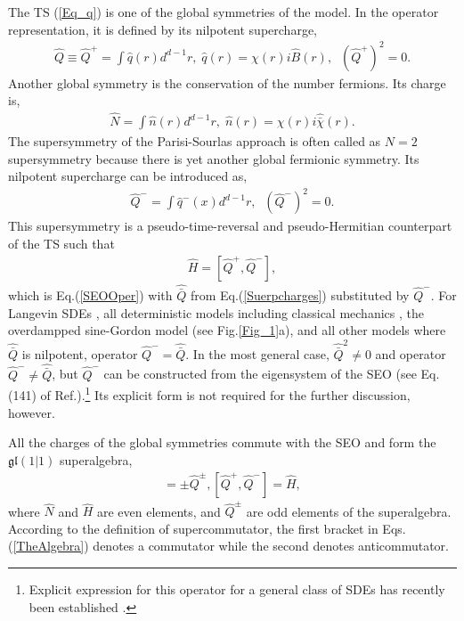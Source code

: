 \documentclass[final,5p,10pt,times,twocolumn,year]{elsarticle}
\begin{document}
The TS (\ref{Eq_q}) is one of the global symmetries of the model. In the operator representation, it is defined by its nilpotent supercharge, 
\begin{eqnarray}
\hat Q \equiv \hat Q^+ =  \int \hat q(r) d^{d-1}r,\; \hat q(r) = \chi(r) i\hat B(r), \;\; (\hat{Q}^+)^2 =0.
\end{eqnarray}
Another global symmetry is the conservation of the number fermions. Its charge is,
\begin{eqnarray}
    \hat N = \int \hat n(r) d^{d-1} r,\; \hat n(r) = \chi(r) i\hat{\bar \chi}(r).
\end{eqnarray}
The supersymmetry of the Parisi-Sourlas approach is often called as $N=2$ supersymmetry because there is yet another global fermionic symmetry. Its nilpotent supercharge can be introduced as,
\begin{eqnarray}
\hat{Q}^- = \int  \hat{q}^-(x) d^{d-1}r, \; \; (\hat{Q}^-)^2 = 0.
\end{eqnarray}
This supersymmetry is a pseudo-time-reversal and pseudo-Hermitian counterpart of the TS such that
\begin{eqnarray}
   \hat H = [\hat Q^+, \hat Q^-],
\end{eqnarray}
which is Eq.(\ref{SEOOper}) with $\hat{\bar Q}$ from Eq.(\ref{Suerpcharges}) substituted by $\hat Q^-$. For Langevin SDEs \cite{TFT_BOOK}, all deterministic models including classical mechanics \cite{Gozzi_New}, the overdampped sine-Gordon model \cite{OVCHINNIKOV2024114611} (see Fig.\ref{Fig_1}a), and all other models where $\hat {\bar Q}$ is nilpotent, operator $\hat Q^-=\hat {\bar Q}$. In the most general case, $\hat {\bar Q}^2\ne0$ and operator $\hat Q^-\ne\hat {\bar Q}$, but $\hat Q^-$ can be constructed from the eigensystem of the SEO (see Eq.(141) of Ref.\cite{OvcEntropy}).\footnote{Explicit expression for this operator for a general class of SDEs has recently been established \cite{Weiderpass_Sethi}.} Its explicit form is not required for the further discussion, however. 

All the charges of the global symmetries commute with the SEO and form the $\mathfrak{gl}(1|1)$ superalgebra,
\begin{eqnarray}
    [\hat N, \hat Q^\pm] = \pm \hat Q^{\pm}, [\hat Q^+, \hat Q^-] = \hat H,\label{TheAlgebra}
\end{eqnarray}
where $\hat N$ and $\hat H$ are even elements, and $\hat Q^{\pm}$ are odd elements of the superalgebra. According to the definition of supercommutator, the first bracket in Eqs.(\ref{TheAlgebra}) denotes a commutator while the second denotes anticommutator. 
\end{document}
